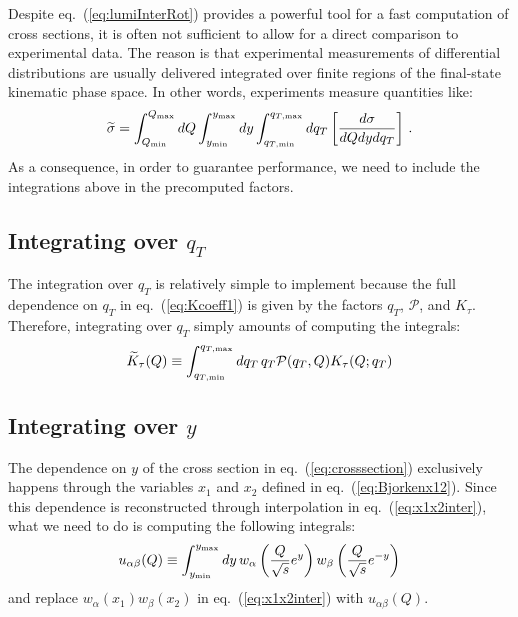\documentclass[10pt,a4paper]{article}
\begin{document}
Despite eq.~(\ref{eq:lumiInterRot}) provides a powerful tool for a
fast computation of cross sections, it is often not sufficient to
allow for a direct comparison to experimental data. The reason is that
experimental measurements of differential distributions are usually
delivered integrated over finite regions of the final-state kinematic
phase space. In other words, experiments measure quantities like:
\begin{equation}\label{eq:Intcrosssection}
\widetilde{\sigma}=\int_{Q_{\rm min}}^{Q_{\rm max}}dQ \int_{y_{\rm min}}^{y_{\rm max}}dy \int_{q_{T,\rm min}}^{q_{T,\rm max}}dq_T\left[\frac{d\sigma}{dQ dy dq_T} \right]\,.
\end{equation}
As a consequence, in order to guarantee performance, we need to
include the integrations above in the precomputed factors.

\subsection{Integrating over $q_T$}

The integration over $q_T$ is relatively simple to implement because
the full dependence on $q_T$ in eq.~(\ref{eq:Kcoeff1}) is given by the
factors $q_T$, $\mathcal{P}$, and $K_\tau$. Therefore, integrating
over $q_T$ simply amounts of computing the integrals:
\begin{equation}\label{eq:KcoeffInt}
  \widetilde{K}_\tau(Q)\equiv \int_{q_{T,\rm min}}^{q_{T,\rm max}}dq_T\,q_T\mathcal{P}(q_T,Q) K_\tau(Q;q_T)
\end{equation}

\subsection{Integrating over $y$}

The dependence on $y$ of the cross section in
eq.~(\ref{eq:crosssection}) exclusively happens through the variables
$x_1$ and $x_2$ defined in eq.~(\ref{eq:Bjorkenx12}). Since this
dependence is reconstructed through interpolation in
eq.~(\ref{eq:x1x2inter}), what we need to do is computing the
following integrals:
\begin{equation}
u_{\alpha\beta}(Q)\equiv \int_{y_{\rm min}}^{y_{\rm max}}dy\,w_\alpha\left(\frac{Q}{\sqrt{s}}e^y\right)w_\beta\left(\frac{Q}{\sqrt{s}}e^{-y}\right)
\end{equation}
and replace $w_\alpha(x_1)w_\beta(x_2)$ in eq.~(\ref{eq:x1x2inter})
with $u_{\alpha\beta}(Q)$.
\end{document}
